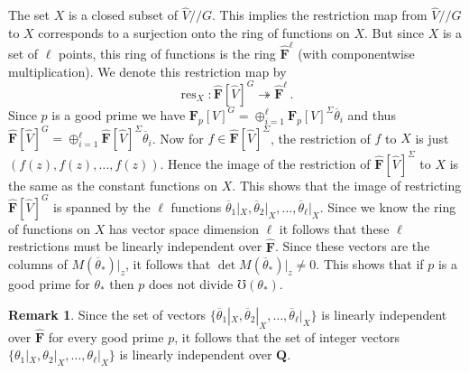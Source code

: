 \documentclass[12pt]{amsart}
\DeclareMathOperator{\res}{res}
\newcommand{\QQ}{\mathbf{Q}} %
\newcommand{\FF}{\mathbf{F}} %
\newcommand{\QQ}{\mathbb{Q}} %
\newcommand{\FF}{\mathbb{F}} %
\theoremstyle{definition}
\newtheorem{remark}[thm]{Remark}
\newcommand{\hVmodG}{{\widehat{V}/\!\!/G}}
\newcommand{\btheta}{{\overline{\theta}}}
\newcommand{\bth}{{{\theta_*}}} %
\begin{document}
  The set $X$ is a closed subset of $\hVmodG$.  This implies  the restriction map from 
  $\hVmodG$ to $X$
  corresponds to a surjection onto the ring of functions on $X$.  But since $X$ is a set of $\ell$ points, this ring of functions is the ring 
  $\widehat{\FF}^\ell$ (with componentwise multiplication).   We denote this restriction map by
    $$
        \res_X:\widehat{\FF}[\widehat{V}]^G \twoheadrightarrow \widehat{\FF}^\ell\, .
    $$
    Since $p$ is a good prime we have
  $\FF_p[V]^G = \oplus_{i=1}^\ell \FF_p[V]^{\Sigma}\btheta_i$ and thus 
   $\widehat{\FF}[\widehat{V}]^G = \oplus_{i=1}^\ell \widehat{\FF}[\widehat{V}]^{\Sigma}\btheta_i$.  Now for $f \in \widehat{\FF}[\widehat{V}]^{\Sigma}$, the restriction of $f$ to $X$ is just 
   $(f(z),f(z),\dots,f(z))$.  Hence the image of the restriction of $\widehat{\FF}[\widehat{V}]^{\Sigma}$ to $X$ is the same as the constant functions 
   on $X$.  This shows that the image of restricting $\widehat{\FF}[\widehat{V}]^G$ is spanned by the $\ell$ functions
   ${\btheta_1}\rvert{_X},{\btheta_2}\rvert_X,\dots,{\btheta_\ell}\rvert_X$.  Since we know the ring of functions on $X$ has 
   vector space dimension $\ell$ it follows that these $\ell$ restrictions must be linearly independent over $\widehat{\FF}$.
   Since these vectors are the columns of $M(\overline{\theta}_*)\rvert_z$, it follows that $\det M(\overline{\theta}_*)\rvert_z \ne 0$.  This shows that
   if $p$ is a good prime for $\bth$  
   then $p$ does not divide $\mho(\bth)$.

 \begin{remark}\label{rem: lin ind over Q}
   Since the set of vectors 
   $\{\overline{\theta}_1|_X,\overline{\theta}_2|_X,\dots,\overline{\theta}_\ell|_X\}$
   is linearly independent over $\widehat{\FF}$ for every good prime $p$, it follows that the set of integer vectors 
  $\{\theta_1|_X,\theta_2|_X,\dots,\theta_\ell|_X\}$ is linearly independent over $\QQ$.
 \end{remark}
\end{document}
